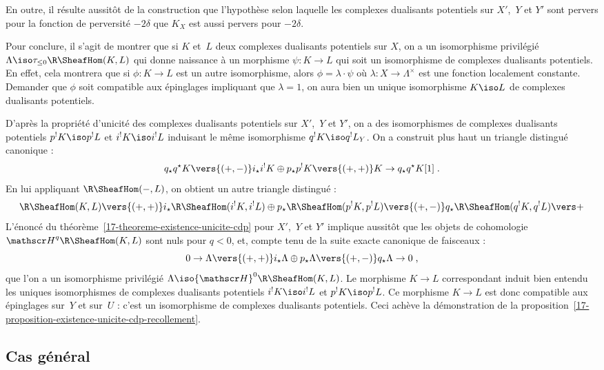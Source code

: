 \documentclass[10pt]{../fichiers-configuration-latex/smfart}
\begin{document}
En outre, il résulte aussitôt de la construction que l'hypothèse selon
laquelle les complexes dualisants potentiels sur $X'$, $Y$ et $Y'$ sont
pervers pour la fonction de perversité $-2\delta$ que $K_X$ est aussi
pervers pour $-2\delta$.

Pour conclure, il s'agit de montrer que si
$K$ et $L$ deux complexes dualisants potentiels sur $X$,
on a un isomorphisme 
privilégié $\Lambda\iso \tau_{\leq 0}\R\SheafHom(K,L)$ qui
donne naissance à un morphisme $\psi\colon K\to L$ 
qui soit un isomorphisme de
complexes dualisants potentiels. En effet, cela montrera que si $\phi\colon
K\to L$ est un autre isomorphisme, alors $\phi=\lambda\cdot \psi$ où
$\lambda\colon X\to \Lambda^\times$ est une fonction localement constante.
Demander que $\phi$ soit compatible aux épinglages impliquant que
$\lambda=1$, on aura bien un unique isomorphisme $K\iso L$ de
complexes dualisants potentiels.

D'après la propriété d'unicité des complexes dualisants potentiels sur
$X'$, $Y$ et $Y'$, on a des isomorphismes de complexes dualisants
potentiels $p^!K\iso p^!L$ et $i^! K\iso i^!L$ induisant le
même isomorphisme $q^!K\iso q^!L_Y$. On a construit plus haut un
triangle distingué canonique :
\[q_\star q^\star K\vers{(+,-)} i_\star i^! K\oplus p_\star p^!
K\vers{(+,+)} K\to q_\star q^\star K[1]\;\text{.}\]
En lui appliquant $\R \SheafHom(-,L)$, on obtient un autre triangle
distingué :
\[\R\SheafHom(K,L)\vers{(+,+)} i_\star
\R\SheafHom(i^!K,i^!L)\oplus p_\star \R\SheafHom(p^!K,p^!L)
\vers {(+,-)} q_\star \R\SheafHom(q^!K,q^!L)\vers +
\]
L'énoncé du théorème~\ref{17-theoreme-existence-unicite-cdp} pour $X'$, $Y$ et
$Y'$ implique aussitôt que les objets de cohomologie 
${\mathscr H}^q\R\SheafHom(K,L)$ sont nuls pour $q<0$, et, compte
tenu de la suite exacte canonique de faisceaux :
\[0\to \Lambda\vers {(+,+)} i_\star\Lambda\oplus p_\star\Lambda\vers{(+,-)}
q_\star\Lambda\to 0\;\text{,}\]
que l'on a un isomorphisme privilégié $\Lambda\iso {\mathscr
H}^0\R\SheafHom(K,L)$. Le morphisme $K\to L$ correspondant induit
bien entendu les uniques isomorphismes de complexes dualisants potentiels
$i^!K\iso i^!L$ et $p^!K\iso p^!L$. Ce morphisme $K\to L$ est donc
compatible aux épinglages sur $Y$ et sur $U$ : c'est un isomorphisme de
complexes dualisants potentiels. Ceci achève la démonstration de la
proposition~\ref{17-proposition-existence-unicite-cdp-recollement}.

\subsection{Cas général}%
\end{document}
